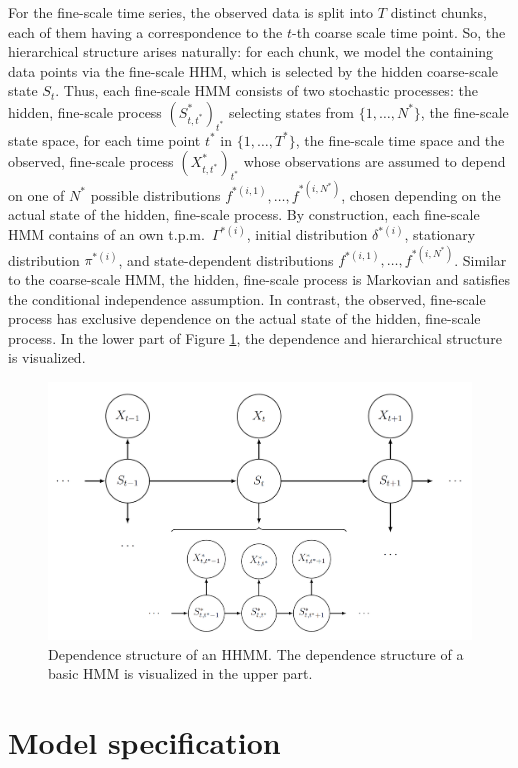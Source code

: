 \documentclass[article]{jss}
\begin{document}
For the fine-scale time series, the observed data is split into $T$ distinct chunks, each of them having a correspondence to the $t$-th coarse scale time point. So, the hierarchical structure arises naturally: for each chunk, we model the containing data points via the fine-scale HHM, which is selected by the hidden coarse-scale state $S_t$. Thus, each fine-scale HMM consists of two stochastic processes: the hidden, fine-scale process $(S^*_{t,t^*})_{t^*}$ selecting states from $\{1,\dots,N^*\}$, the fine-scale state space, for each time point $t^*$ in $\{1,\dots,T^*\}$, the fine-scale time space and the observed, fine-scale process $(X^*_{t,t^*})_{t^*}$ whose observations are assumed to depend on one of $N^*$ possible distributions $f^{*(i,1)},\dots,f^{*(i,N^*)}$, chosen depending on the actual state of the hidden, fine-scale process. By construction, each fine-scale HMM contains of an own t.p.m.\ $\Gamma^{*(i)}$, initial distribution $\delta^{*(i)}$, stationary distribution $\pi^{*(i)}$, and state-dependent distributions $f^{*(i,1)},\dots,f^{*(i,N^*)}$. Similar to the coarse-scale HMM, the hidden, fine-scale process is Markovian and satisfies the conditional independence assumption. In contrast, the observed, fine-scale process has exclusive dependence on the actual state of the hidden, fine-scale process. In the lower part of Figure \ref{fig:hhmm}, the dependence and hierarchical structure is visualized.

\begin{figure}
  \centering
  \includegraphics{hhmm.png}
  \caption{Dependence structure of an HHMM. The dependence structure of a basic HMM is visualized in the upper part.}
  \label{fig:hhmm}
\end{figure}

\section{Model specification} \label{sec:model_specification} %
\end{document}
